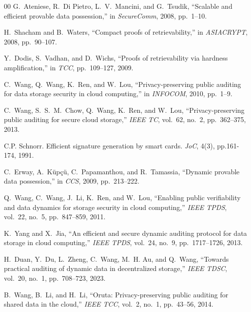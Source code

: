 \documentclass[lettersize,journal]{IEEEtran}
\begin{document}
\begin{thebibliography}{00}
G.~Ateniese, R.~Di Pietro, L.~V.~Mancini, and G.~Tsudik,
``Scalable and efficient provable data possession,''
in \emph{SecureComm}, 2008, pp.~1--10.

 H.~Shacham and B.~Waters,
``Compact proofs of retrievability,''
in \emph{ASIACRYPT}, 2008, pp.~90--107.

Y.~Dodis, S.~Vadhan, and D.~Wichs,
``Proofs of retrievability via hardness amplification,''
in \emph{TCC}, pp.~109--127, 2009.

C.~Wang, Q.~Wang, K.~Ren, and W.~Lou,
``Privacy-preserving public auditing for data storage security in cloud computing,''
in \emph{INFOCOM}, 2010, pp.~1--9.

C.~Wang, S.~S.~M.~Chow, Q.~Wang, K.~Ren, and W.~Lou,
``Privacy-preserving public auditing for secure cloud storage,''
\emph{IEEE TC}, vol.~62, no.~2, pp.~362--375, 2013.


C.P. Schnorr. Efficient signature generation by smart cards. \emph{JoC}, 4(3), pp.161-174, 1991.

C.~Erway, A.~K{\"u}p{\c{c}}{\"u}, C.~Papamanthou, and R.~Tamassia,
``Dynamic provable data possession,''
in \emph{CCS}, 2009, pp.~213--222.

Q.~Wang, C.~Wang, J.~Li, K.~Ren, and W.~Lou,
``Enabling public verifiability and data dynamics for storage security in cloud computing,''
\emph{IEEE TPDS}, vol.~22, no.~5, pp.~847--859, 2011.

K.~Yang and X.~Jia,
``An efficient and secure dynamic auditing protocol for data storage in cloud computing,''
\emph{IEEE TPDS}, vol.~24, no.~9, pp.~1717--1726, 2013.

H.~Duan, Y.~Du, L.~Zheng, C.~Wang, M.~H. Au, and Q.~Wang,
``Towards practical auditing of dynamic data in decentralized storage,''
\emph{IEEE TDSC}, vol.~20, no.~1, pp.~708--723, 2023.

B.~Wang, B.~Li, and H.~Li,
``Oruta: Privacy-preserving public auditing for shared data in the cloud,''
\emph{IEEE TCC}, vol.~2, no.~1, pp.~43--56, 2014.


\end{thebibliography}
\end{document}
